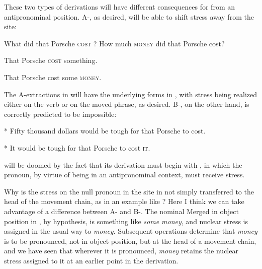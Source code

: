 \documentclass[output=paper]{LSP/langsci}
\begin{document}
  These two types of derivations will have different consequences for  from an antipronominal position.  A-, as desired, will be able to shift stress away from the  site:


\ea%
    \label{ex:richards:46prim} %
  
\ea \label{ex:richards:46prima} 
    What did that Porsche \textsc{cost} ?
\ex 
    \label{ex:richards:46primb}
    How much \textsc{money} did that Porsche cost?
\z
\z


\ea%
    \label{ex:richards:47prim}
  
\ea That Porsche \textsc{cost} something.

\ex That Porsche cost some \textsc{money}.
\z
\z

The A-extractions in  will have the underlying forms in , with stress being realized either on the verb or on the moved phrase, as desired.  B-, on the other hand, is correctly predicted to be impossible:


\ea%
    \label{ex:richards:48prim}
  
\ea   \label{ex:richards:48prima}     *  Fifty thousand dollars would be tough for that Porsche to cost.

\ex   \label{ex:richards:48primb}     *  It would be tough for that Porsche to cost \textsc{it}.
\z
\z

 will be doomed by the fact that its derivation must begin with , in which the pronoun, by virtue of being in an antipronominal context, must receive stress.  

  Why is the stress on the null pronoun in the  site in  not simply transferred to the head of the movement chain, as in an example like ?  Here I think we can take advantage of a difference between A- and B-.  The nominal Merged in object position in , by hypothesis, is something like \textit{some money}, and nuclear stress is assigned in the usual way to \textit{money}.  Subsequent operations determine that \textit{money} is to be pronounced, not in object position, but at the head of a movement chain, and we have seen that wherever it is pronounced, \textit{money} retains the nuclear stress assigned to it at an earlier point in the derivation.
\end{document}
